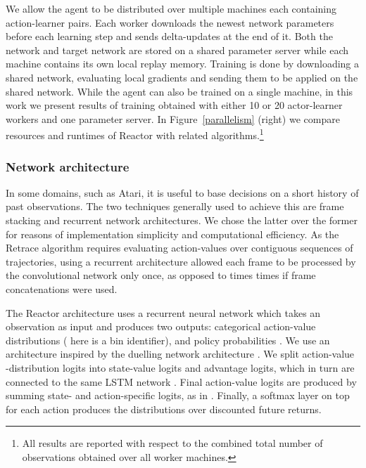 \documentclass{article}
\begin{document}
We allow the agent to be distributed over 
multiple machines each containing action-learner pairs. Each worker downloads the 
newest network parameters before each learning step and sends delta-updates at 
the end of it. Both the network and target 
network are stored on a 
shared parameter server while each machine contains its own local replay 
memory. 
Training is done by downloading a shared network, evaluating local gradients 
and 
sending them to be applied on the shared network. While the agent can also be 
trained on a single machine, in this work we present results of 
training obtained with either 10 or 20 actor-learner workers and one parameter server.
In Figure~\ref{parallelism} (right) we compare resources and runtimes of 
Reactor with related algorithms.\footnote{All results are reported with respect 
to the combined total number of observations obtained over all worker machines.}





\subsubsection{Network architecture}\label{sec:net_arch}
In some domains, such as Atari, it is useful to base decisions on a 
short history of past observations. The two techniques generally used to 
achieve this are frame stacking and recurrent network architectures. We 
chose the latter over the former for reasons 
of implementation simplicity and computational 
efficiency. As the Retrace algorithm requires evaluating action-values over contiguous 
sequences of trajectories, using a recurrent architecture allowed each frame to 
be processed by the convolutional network only once, as opposed to  times 
times if  frame concatenations were used. 

The Reactor architecture uses a recurrent neural network which 
takes an observation  as input and produces two outputs:  
categorical action-value distributions  ( here is a bin 
identifier), and policy probabilities . 
We use an architecture inspired by the duelling network architecture 
\citep{wang2015dueling}. We split action-value -distribution logits into 
state-value logits and advantage logits, which 
in turn are connected to the same LSTM network \citep{hochreiter1997long}.
Final action-value logits are produced by summing state- and action-specific 
logits, as in \citet{wang2015dueling}. Finally, a softmax layer on top for each action produces the distributions over discounted 
future returns.
\end{document}
